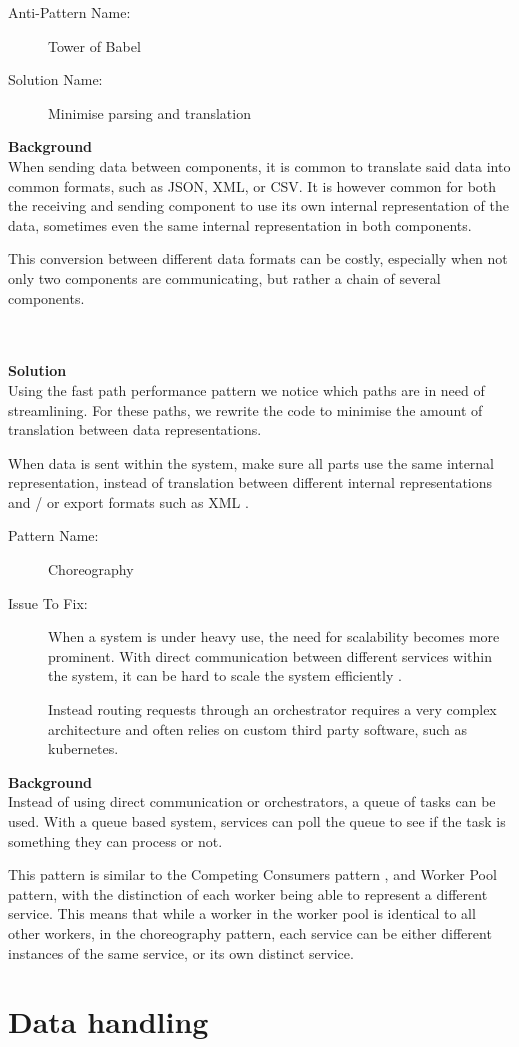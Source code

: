 \documentclass[a4paper,UKenglish]{dagrep}
\newcommand{\pattern}[6]{
\begin{center}
  \begin{patt}
    \begin{description}
      \item[Pattern Name:]#1
      \ifthenelse{#2 = 0}{~}{\item[Also Known As:]#3}
      \item[Issue To Fix:]#5
    \end{description}
  \end{patt}
\end{center}
  \textbf{Background}\\#6

  }
\newcommand{\antipattern}[7]{
  \begin{center}
    \begin{apatt}
      \begin{description}
        \item[Anti-Pattern Name:]#1
        \ifthenelse{#2 = 0}{~}{\item[Also Known As:]#3}
        \item[Solution Name:]#5
      \end{description}
    \end{apatt}
  \end{center}
  \textbf{Background}\\#6
  ~\\\\
  \textbf{Solution}\\#7
  }
\begin{document}
\antipattern{Tower of Babel \cite{more_se_antipatterns, detect_antipatterns}}{0}{}{Most frequent}{Minimise parsing and translation}{
	When sending data between components, it is common to translate said data into common formats, such as JSON, XML, or CSV. It is however common for both the receiving and sending component to use its own internal representation of the data, sometimes even the same internal representation in both components.

	This conversion between different data formats can be costly, especially when not only two components are communicating, but rather a chain of several components.
}{
	Using the fast path performance pattern \cite{more_se_antipatterns} we notice which paths are in need of streamlining. For these paths, we rewrite the code to minimise the amount of translation between data representations.

	When data is sent within the system, make sure all parts use the same internal representation, instead of translation between different internal representations and / or export formats such as XML \cite{more_se_antipatterns}.

}

\pattern{Choreography \cite{microsoft2024performanceefficiency}}{0}{}{}{When a system is under heavy use, the need for scalability becomes more prominent. With direct communication between different services within the system, it can be hard to scale the system efficiently \cite{microsoft2024performanceefficiency}.

	Instead routing requests through an orchestrator requires a very complex architecture and often relies on custom third party software, such as kubernetes.}{
	Instead of using direct communication or orchestrators, a queue of tasks can be used. With a queue based system, services can poll the queue to see if the task is something they can process or not.

	This pattern is similar to the Competing Consumers pattern \cite{microsoft2024performanceefficiency}, and Worker Pool pattern\cite{zepeda2024workerpool}, with the distinction of each worker being able to represent a different service. This means that while a worker in the worker pool is identical to all other workers, in the choreography pattern, each service can be either different instances of the same service, or its own distinct service.


}



\section{Data handling}
\end{document}
